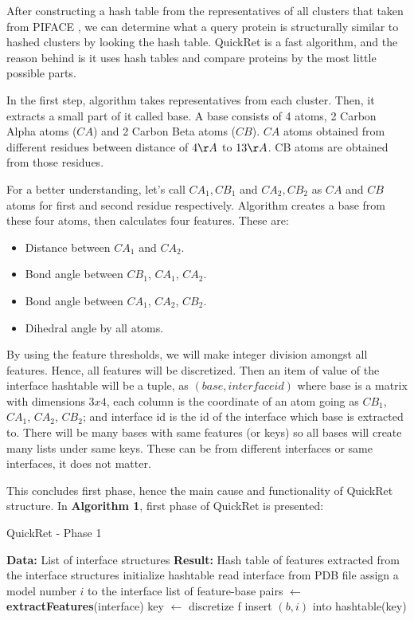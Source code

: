 \documentclass{article}
\begin{document}
After constructing a hash table from the representatives of all clusters that taken from PIFACE \citep{RN5}, we can determine what a query protein is structurally similar to hashed clusters by looking the hash table. QuickRet is a fast algorithm, and the reason behind is it uses hash tables and compare proteins by the most little possible parts.

In the first step, algorithm takes representatives from each cluster. Then, it extracts a small part of it called base. A base consists of 4 atoms, 2 Carbon Alpha atoms ($CA$) and 2 Carbon Beta atoms ($CB$). $CA$ atoms obtained from different residues between distance of $4 \AA$ to $13 \AA$. CB atoms are obtained from those residues.

For a better understanding, let's call $CA_1, CB_1$ and $CA_2, CB_2$ as $CA$ and $CB$ atoms for first and second residue respectively. Algorithm creates a base from these four atoms, then calculates four features. These are:
\begin{itemize}
    \item Distance between $CA_1$ and $CA_2$.
    \item Bond angle between $CB_1$, $CA_1$, $CA_2$.
    \item Bond angle between $CA_1$, $CA_2$, $CB_2$.
    \item Dihedral angle by all atoms.
\end{itemize}

By using the feature thresholds, we will make integer division amongst all features. Hence, all features will be discretized. Then an item of value of the interface hashtable will be a tuple, as $(base, interface id)$ where base is a matrix with dimensions $3x4$, each column is the coordinate of an atom going as $CB_1$, $CA_1$, $CA_2$, $CB_2$; and interface id is the id of the interface which base is extracted to. There will be many bases with same features (or keys) so all bases will create many lists under same keys. These can be from different interfaces or same interfaces, it does not matter.

This concludes first phase, hence the main cause and functionality of QuickRet structure. In \textbf{Algorithm 1}, first phase of QuickRet is presented:

\begin{algorithm}
\caption{QuickRet - Phase 1}\label{euclid}
\begin{algorithmic}[1]
\State \textbf{Data:} List of interface structures
\State \textbf{Result:} Hash table of features extracted from the interface structures
\State initialize hashtable
\State read interface from PDB file
\State assign a model number $i$ to the interface
\State list of feature-base pairs $\leftarrow$ \textbf{extractFeatures}(interface)
\State key $\leftarrow$ discretize f
\State insert $(b,i)$ into hashtable(key)
\EndFor
\EndFor
\end{algorithmic}
\end{algorithm}
\end{document}
